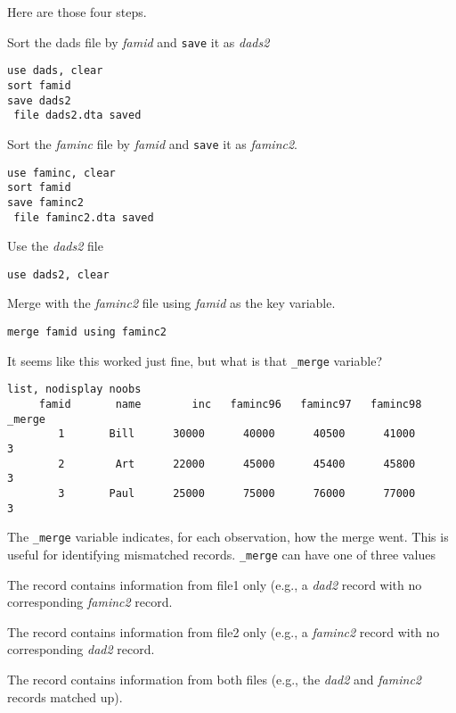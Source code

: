 Here are those four steps.
\begin{compactenum}
\item Sort the dads file by \textit{famid} and \lstinline{save} it as \textit{dads2}
\begin{lstlisting}
use dads, clear
sort famid
save dads2
 file dads2.dta saved
\end{lstlisting}
\item Sort the \textit{faminc} file by \textit{famid} and \lstinline{save} it as \textit{faminc2}.
\begin{lstlisting}
use faminc, clear
sort famid
save faminc2
 file faminc2.dta saved
\end{lstlisting}
\item Use the \textit{dads2} file
\begin{lstlisting}
use dads2, clear
\end{lstlisting}
\item Merge with the \textit{faminc2} file using \textit{famid} as the key variable.
\begin{lstlisting}
merge famid using faminc2
\end{lstlisting}
\end{compactenum}
It seems like this worked just fine, but what is that \lstinline{_merge} variable?

\begin{lstlisting}
list, nodisplay noobs
     famid       name        inc   faminc96   faminc97   faminc98    _merge
        1       Bill      30000      40000      40500      41000         3
        2        Art      22000      45000      45400      45800         3
        3       Paul      25000      75000      76000      77000         3
\end{lstlisting}

The \lstinline{_merge} variable indicates, for each observation, how the merge went. This is useful for identifying mismatched records. \lstinline{_merge} can have one of three values
\begin{compactenum}
\item The record contains information from file1 only (e.g., a \textit{dad2} record with no corresponding \textit{faminc2} record.
\item The record contains information from file2 only (e.g., a \textit{faminc2} record with no corresponding \textit{dad2} record.
\item The record contains information from both files (e.g., the \textit{dad2} and \textit{faminc2} records matched up).
\end{compactenum}

